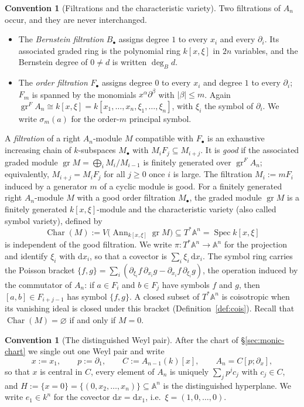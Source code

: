 \documentclass[11pt]{article}
\theoremstyle{plain}
\theoremstyle{definition}
\newtheorem{convention}[theorem]{Convention}
\theoremstyle{remark}
\theoremstyle{plain}
\newcommand{\Char}{\operatorname{Char}}
\newcommand{\gr}{\operatorname{gr}}
\newcommand{\Ann}{\operatorname{Ann}}
\newcommand{\Spec}{\operatorname{Spec}}
\newcommand{\bbA}{\mathbb{A}}
\newcommand{\dd}{\mathrm{d}}
\begin{document}
\begin{convention}[Filtrations and the characteristic variety]\label{conv:filt}
Two filtrations of $A_n$ occur, and they are never interchanged.
\begin{itemize}[nosep,leftmargin=1.4em]
\item The \emph{Bernstein filtration} $B_\bullet$ assigns degree $1$ to every
  $x_i$ and every $\partial_i$. Its associated graded ring is the polynomial
  ring $k[x,\xi]$ in $2n$ variables, and the Bernstein degree of $0\neq d$ is
  written $\deg_B d$.
\item The \emph{order filtration} $F_\bullet$ assigns degree $0$ to every $x_i$
  and degree $1$ to every $\partial_i$; $F_m$ is spanned by the monomials
  $x^\alpha\partial^\beta$ with $|\beta|\le m$. Again
  $\gr^F A_n\cong k[x,\xi]=k[x_1,\dots,x_n,\xi_1,\dots,\xi_n]$, with $\xi_i$
  the symbol of $\partial_i$. We write $\sigma_m(a)$ for the order-$m$
  principal symbol.
\end{itemize}
A \emph{filtration} of a right $A_n$-module $M$ compatible with $F_\bullet$
is an exhaustive increasing chain of $k$-subspaces $M_\bullet$ with
$M_iF_j\subseteq M_{i+j}$. It is \emph{good} if the associated graded module
$\gr M=\bigoplus_iM_i/M_{i-1}$ is finitely generated over $\gr^FA_n$;
equivalently, $M_{i+j}=M_iF_j$ for all $j\ge0$ once $i$ is large. The
filtration $M_i:=mF_i$ induced by a generator $m$ of a cyclic module is good.
For a finitely generated right $A_n$-module $M$ with a good order filtration
$M_\bullet$, the graded module $\gr M$ is a finitely generated $k[x,\xi]$-module
and the characteristic variety (also called symbol variety), defined by
\[
  \Char(M):=V\bigl(\Ann_{k[x,\xi]}\gr M\bigr)\subseteq
  T^*\bbA^n=\Spec k[x,\xi]
\]
is independent of the good filtration. We write $\pi\colon T^*\bbA^n\to\bbA^n$
for the projection and identify $\xi_i$ with $\dd x_i$, so that a covector is
$\sum_i\xi_i\,\dd x_i$. The symbol ring carries the Poisson bracket
$\{f,g\}=\sum_i(\partial_{\xi_i}f\,\partial_{x_i}g-\partial_{x_i}f\,\partial_{\xi_i}g)$,
the operation induced by the commutator of $A_n$: if $a\in F_i$ and $b\in F_j$
have symbols $f$ and $g$, then $[a,b]\in F_{i+j-1}$ has symbol $\{f,g\}$. A
closed subset of $T^*\bbA^n$ is coisotropic when its vanishing ideal is
closed under this bracket (Definition~\ref{def:cois}).
Recall that $\Char(M)=\varnothing$ if and only if $M=0$.
\end{convention}

\begin{convention}[The distinguished Weyl pair]\label{conv:pair}
After the chart of \S\ref{sec:monic-chart} we single out one Weyl pair and write
\[
  x:=x_1,\qquad p:=\partial_1,\qquad
  C:=A_{n-1}(k)[x],\qquad A_n=C[p;\partial_x],
\]
so that $x$ is central in $C$, every element of $A_n$ is uniquely
$\sum_j p^j c_j$ with $c_j\in C$, and $H:=\{x=0\}=\{(0,x_2,\dots,x_n)\}\subseteq\bbA^n$
is the distinguished hyperplane. We write $e_1\in k^n$ for the covector $\dd x=\dd x_1$,
i.e.\ $\xi=(1,0,\dots,0)$.
\end{convention}
\end{document}
